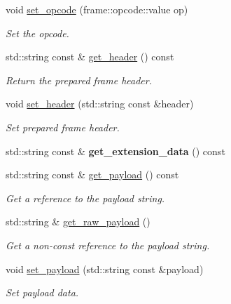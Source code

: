 \begin{DoxyCompactItemize}
void \mbox{\hyperlink{classwebsocketpp_1_1message__buffer_1_1message_a96571972bb7dfaf1ffcae2fbedb07bbe}{set\+\_\+opcode}} (frame\+::opcode\+::value op)
\begin{DoxyCompactList}\small\item\em Set the opcode. \end{DoxyCompactList}\item 
std\+::string const  \& \mbox{\hyperlink{classwebsocketpp_1_1message__buffer_1_1message_a020b849ba700f5fefebb2f461a97505e}{get\+\_\+header}} () const
\begin{DoxyCompactList}\small\item\em Return the prepared frame header. \end{DoxyCompactList}\item 
void \mbox{\hyperlink{classwebsocketpp_1_1message__buffer_1_1message_a230b36c0cd2572cfce1f218a15bc534e}{set\+\_\+header}} (std\+::string const \&header)
\begin{DoxyCompactList}\small\item\em Set prepared frame header. \end{DoxyCompactList}\item 
\mbox{\label{classwebsocketpp_1_1message__buffer_1_1message_a8473c7254d7a8aba0d2840c474234fdc}} 
std\+::string const  \& {\bfseries get\+\_\+extension\+\_\+data} () const
\item 
std\+::string const  \& \mbox{\hyperlink{classwebsocketpp_1_1message__buffer_1_1message_ab4e036246895b96ae93c544cae28496b}{get\+\_\+payload}} () const
\begin{DoxyCompactList}\small\item\em Get a reference to the payload string. \end{DoxyCompactList}\item 
std\+::string \& \mbox{\hyperlink{classwebsocketpp_1_1message__buffer_1_1message_a403b47e95d65df5b7514eb4eaa89a6df}{get\+\_\+raw\+\_\+payload}} ()
\begin{DoxyCompactList}\small\item\em Get a non-\/const reference to the payload string. \end{DoxyCompactList}\item 
void \mbox{\hyperlink{classwebsocketpp_1_1message__buffer_1_1message_a349d38ec257bde2f6f657cb31af80ced}{set\+\_\+payload}} (std\+::string const \&payload)
\begin{DoxyCompactList}\small\item\em Set payload data. \end{DoxyCompactList}\item 

\end{DoxyCompactItemize}
